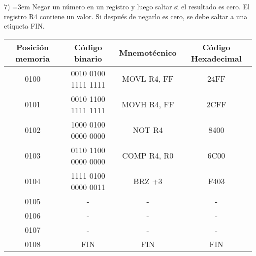 \documentclass[a4paper,12pt]{article}
\begin{document}
	\vspace{1.5cm}
	
	7) \hangindent=3em Negar un número en un registro y luego saltar si el resultado es cero. El registro R4
	contiene un valor. Si después de negarlo es cero, se debe saltar a una etiqueta FIN.
	
	\vspace{0.5cm}
	
	\begin{tabular}{c|c|c|c}
		\textbf{Posición memoria} & \textbf{Código binario} & \textbf{Mnemotécnico} & \textbf{Código Hexadecimal}\\
		\hline
		0100 & 0010 0100 1111 1111 & MOVL R4, FF & 24FF \\
		0101 & 0010 1100 1111 1111 & MOVH R4, FF & 2CFF \\
		0102 & 1000 0100 0000 0000 & NOT R4 & 8400 \\
		0103 & 0110 1100 0000 0000 & COMP R4, R0 & 6C00 \\
		0104 & 1111 0100 0000 0011 & BRZ +3 & F403 \\		
		0105 & - & - & - \\		
		0106 & - & - & - \\		
		0107 & - & - & - \\
		0108 & FIN & FIN & FIN \\	
	\end{tabular}
\end{document}
